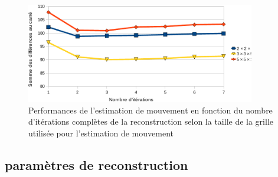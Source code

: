 \begin{figure}
\centering
\includegraphics[width=10cm]{images/perfsRecalageFctIter-grid_crop}
\caption[Performances de l'estimation de mouvement en fonction de la taille de la grille de recherche]{Performances de l'estimation de mouvement en fonction du nombre d'itérations complètes de la reconstruction selon la taille de la grille utilisée pour l'estimation de mouvement}
\label{lab:perfsFctIterTaille}
\end{figure}


\subsection{paramètres de reconstruction}

